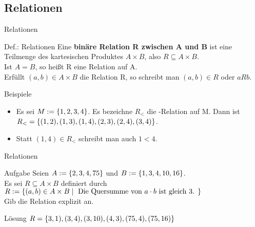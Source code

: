 \subsection{Relationen}
	\begin{frame}{Relationen}
		\begin{block}{Def.: Relationen}
			Eine \textbf{binäre Relation R zwischen A und B} ist eine Teilmenge des kartesischen Produktes $A \times B$, also $R \subseteq A \times B$.\\
			Ist $A=B$, so heißt R eine Relation auf A.\\
			Erfüllt $(a,b) \in A \times B$ die Relation R, so schreibt man $(a,b) \in R$ oder $aRb$.
		\end{block}
	
		\begin{exampleblock}{Beispiele}
			\begin{itemize}
				\item Es sei $M:=\{ 1,2,3,4 \}$. Es bezeichne $R_<$ die -Relation auf M. Dann ist $R_< = \{ (1,2),(1,3),(1,4),(2,3),(2,4),(3,4) \}$.
				\item Statt $(1,4) \in R_<$ schreibt man auch $1 < 4$.
			\end{itemize}
		\end{exampleblock}
	\end{frame}

	\begin{frame}{Relationen}
		\begin{exampleblock}{Aufgabe}
			Seien $A:=\{ 2,3,4,75 \}$ und $B:=\{ 1,3,4,10,16 \}$.\\ 
			Es sei $R \subseteq A \times B $ definiert durch $R:=\{ (a,b) \in A \times B \mid \text{ Die Quersumme von $a \cdot b$ ist gleich 3. } \}$\\
			Gib die Relation explizit an.
		\end{exampleblock}
	\pause
		\begin{block}{Lösung}		
			$R=\{ 3,1),(3,4),(3,10),(4,3),(75,4),(75,16) \}$
		\end{block}
	\end{frame}


\questionframe
\lastframe

